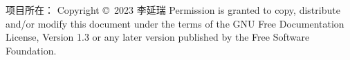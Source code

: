 \blank[line]
项目所在：{\tta{}}
\vfill
Copyright \copyright\  2023  李延瑞
\blank
Permission is granted to copy, distribute and/or modify this document under the terms of the GNU Free Documentation License, Version 1.3 or any later version published by the Free Software Foundation.
\stopstandardmakeup

